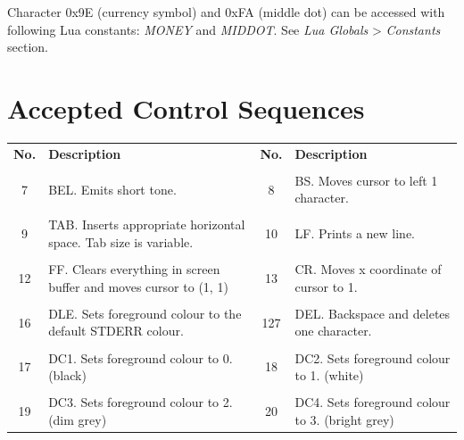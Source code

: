 Character 0x9E (currency symbol) and 0xFA (middle dot) can be accessed with following Lua constants: \emph{MONEY} and \emph{MIDDOT}. See \emph{Lua Globals} > \emph{Constants} section.

\section{Accepted Control Sequences}

\begin{tabularx}{\textwidth}{c X c X}
	\textbf{\large No.} & \textbf{\large Description} & \textbf{\large No.} & \textbf{\large Description}
	\\ \\
	\endhead
	7 & BEL. Emits short tone. & 8 & BS. Moves cursor to left 1 character.
	\\ \\
	9 & TAB. Inserts appropriate horizontal space. Tab size is variable. & 10 & LF. Prints a new line.
	\\ \\
	12 & FF. Clears everything in screen buffer and moves cursor to (1, 1) & 13 & CR. Moves x coordinate of cursor to 1.
	\\ \\
	16 & DLE. Sets foreground colour to the default STDERR colour. & 127 & DEL. Backspace and deletes one character.
	\\ \\
	17 & DC1. Sets foreground colour to 0. (black) & 18 & DC2. Sets foreground colour to 1. (white)
	\\ \\
	19 & DC3. Sets foreground colour to 2. (dim grey) & 20 & DC4. Sets foreground colour to 3. (bright grey)
\end{tabularx}